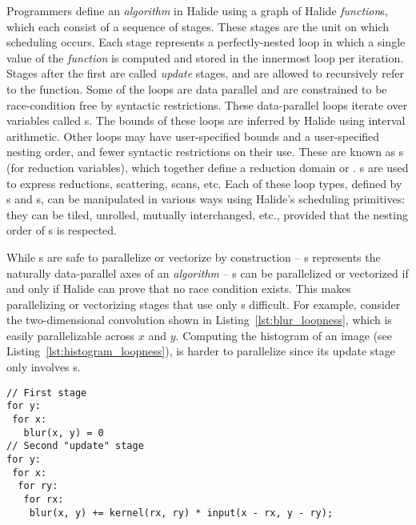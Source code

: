 Programmers define an \emph{algorithm} in Halide using a graph of Halide \emph{function}s, which each consist of a sequence of stages. These stages are the unit on which scheduling occurs. Each stage represents a perfectly-nested loop in which a single value of the \emph{function} is computed and stored in the innermost loop per iteration. Stages after the first are called \emph{update} stages, and are allowed to recursively refer to the function. Some of the loops are data parallel and are constrained to be race-condition free by syntactic restrictions. These data-parallel loops iterate over variables called s. The bounds of these loops are inferred by Halide using interval arithmetic. Other loops may have user-specified bounds and a user-specified nesting order, and fewer syntactic restrictions on their use. These are known as s (for reduction variables), which together define a reduction domain or . s are used to express reductions, scattering, scans, etc. Each of these loop types, defined by s and s, can be manipulated in various ways using Halide's scheduling primitives: they can be tiled, unrolled, mutually interchanged, etc., provided that the nesting order of s is respected. 

While s are safe to parallelize or vectorize by construction -- s represents the naturally data-parallel axes of an \emph{algorithm} -- s can be parallelized or vectorized if and only if Halide can prove that no race condition exists. This makes parallelizing or vectorizing stages that use only s difficult. For example, consider the two-dimensional convolution shown in Listing~\ref{lst:blur_loopness}, which is easily parallelizable across  $x$ and $y$. Computing the histogram of an image (see Listing~\ref{lst:histogram_loopness}), is harder to parallelize since its update stage only involves s.

\begin{lstlisting}[caption={Psuedocode for convolution. This algorithm reduces over \code{rx} and \code{ry} and is data-parallel over \code{x} and \code{y}. In the Halide source, \code{rx} and \code{ry} would be \code{RVar}s in a two-dimensional \code{RDom}. \code{x} and \code{y} would be \code{Var}s.}, label={lst:blur_loopness}]
// First stage
for y:
 for x:
   blur(x, y) = 0
// Second "update" stage
for y:
 for x:
  for ry:
   for rx:
    blur(x, y) += kernel(rx, ry) * input(x - rx, y - ry);
\end{lstlisting}


